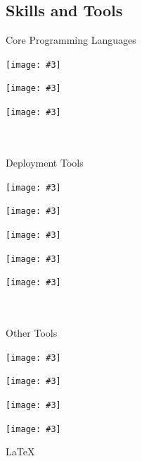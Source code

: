 \documentclass[a4paper, 10pt]{article}
\newcommand{\IconSize}{0.15}
\newcommand{\Icon}[3]{
    \begin{minipage}[c]{#1\textwidth}
        \vspace*{4pt}
        \texttt{[image: \#3]}
    \end{minipage}
}
\begin{document}
\begin{tcbraster}[raster columns=7]
\begin{tcolorbox}[left=1cm, height=1.0\textheight, colback=white, raster multicolumn=5, boxrule=0pt, frame empty, nobeforeafter]
    \section*{Skills and Tools}
    \begin{tcbraster}[raster columns=2]
        \begin{tcolorbox}[colback=white, boxrule=0pt, frame empty, nobeforeafter]
            {\color{textgray} Core Programming Languages }\\
            \Icon{\IconSize}{1.15}{./src/cpp.pdf}
            \Icon{\IconSize}{1.1}{./src/python.pdf}
            \Icon{\IconSize}{1.3}{./src/rust.pdf}
            \\\\
            {\color{textgray} Deployment Tools }\\
            \Icon{\IconSize}{1.1}{./src/cmake.pdf}
            \Icon{\IconSize}{1.1}{./src/conan.pdf}
            \Icon{\IconSize}{1.3}{./src/docker.pdf}
            \Icon{\IconSize}{1.05}{./src/jenkins.pdf}
            \Icon{\IconSize}{1.1}{./src/artifactory.pdf}
            \\\\
            {\color{textgray} Other Tools }\\
            \Icon{\IconSize}{1.0}{./src/neovim.pdf}
            \hspace*{-6pt}
            \Icon{\IconSize}{1.25}{./src/github.pdf}
            \Icon{\IconSize}{1.1}{./src/javascript.pdf}
            \Icon{\IconSize}{1.1}{./src/webassembly.pdf}
            \begin{minipage}[c]{\IconSize\textwidth}
                \vspace*{4pt}
                \hspace*{-3.5pt}
                \LARGE \LaTeX
            \end{minipage}
        \end{tcolorbox}
    \end{tcbraster}
\end{tcolorbox}
\end{tcbraster}
\end{document}
